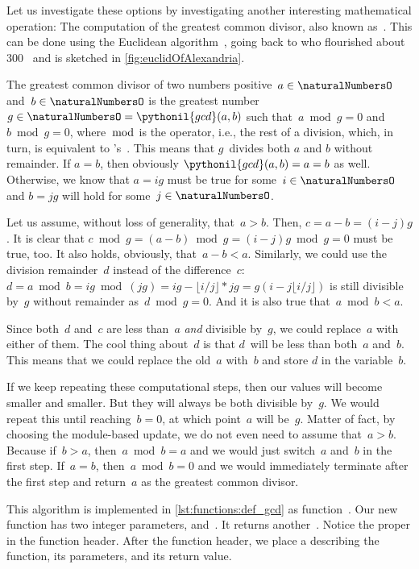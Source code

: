 Let us investigate these options by investigating another interesting mathematical operation:
The computation of the greatest common divisor, also known as~.
This can be done using the Euclidean algorithm~\cite{EHF2008EEOGTGOJLH11FEEEELIEILHIATBG11EAPWMETBFR:ENT,B1999FAOTBEA,TKY2016BEOEAOTCEG}, going back to \citeauthor{EHF2008EEOGTGOJLH11FEEEELIEILHIATBG11EAPWMETBFR:ENT} who flourished about 300~ and is sketched in \cref{fig:euclidOfAlexandria}.

The greatest common divisor of two numbers positive~$a\in\naturalNumbersO$ and~$b\in\naturalNumbersO$ is the greatest number~$g\in\naturalNumbersO=\pythonil{gcd}(a,b)$ such that~$a\bmod g=0$ and~$b \bmod g=0$, where~$\bmod$ is the  operator, i.e., the rest of a division, which, in turn, is equivalent to \python's~\pythonilIdx{\%}.
This means that $g$~divides both $a$ and $b$ without remainder.
If $a=b$, then obviously $\pythonil{gcd}(a,b)=a=b$ as well.
Otherwise, we know that $a=ig$ must be true for some~$i\in\naturalNumbersO$ and $b=jg$ will hold for some~$j\in\naturalNumbersO$.

Let us assume, without loss of generality, that~$a>b$.
Then, $c=a-b=(i-j)g$.
It is clear that $c\bmod g=(a-b)\bmod g=(i-j)g\bmod g = 0$ must be true, too.
It also holds, obviously, that~$a-b < a$.
Similarly, we could use the division remainder~$d$ instead of the difference~$c$:
$d=a\bmod b=ig\bmod (jg)=ig-\lfloor i/j\rfloor*jg=g(i-j\lfloor i/j\rfloor)$ is still divisible by~$g$ without remainder as~$d\bmod g=0$.
And it is also true that~$a\bmod b < a$.

Since both~$d$ and~$c$ are less than~$a$ \emph{and} divisible by~$g$, we could replace~$a$ with either of them.
The cool thing about~$d$ is that $d$~will be less than both~$a$ and~$b$.
This means that we could replace the old~$a$ with~$b$ and store $d$ in the variable~$b$.

If we keep repeating these computational steps, then our values will become smaller and smaller.
But they will always be both divisible by~$g$.
We would repeat this until reaching~$b=0$, at which point~$a$ will be~$g$.
Matter of fact, by choosing the module-based update, we do not even need to assume that~$a>b$.
Because if~$b>a$, then~$a \bmod b=a$ and we would just switch~$a$ and~$b$ in the first step.
If~$a=b$, then~$a \bmod b=0$ and we would immediately terminate after the first step and return~$a$ as the greatest common divisor.

This algorithm is implemented in \cref{lst:functions:def_gcd} as function~.
Our new function  has two integer parameters,  and~.
It returns another~.
Notice the proper  in the function header.
After the function header, we place a  describing the function, its parameters, and its return value.


